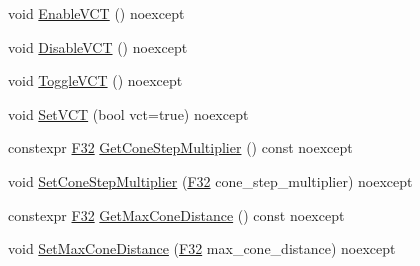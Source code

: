 \begin{DoxyCompactItemize}
\item 
void \hyperlink{classmage_1_1rendering_1_1_voxelization_settings_a1f08a9e6c02ce6c3e392cdb1ad30f75e}{Enable\+V\+CT} () noexcept
\item 
void \hyperlink{classmage_1_1rendering_1_1_voxelization_settings_a7092d02a0878dad9ec4fa21ce1024147}{Disable\+V\+CT} () noexcept
\item 
void \hyperlink{classmage_1_1rendering_1_1_voxelization_settings_a930c8f4d3723e67e8cbfc2b41533ead8}{Toggle\+V\+CT} () noexcept
\item 
void \hyperlink{classmage_1_1rendering_1_1_voxelization_settings_a394b58dd3d414a406fd874f7e53b211f}{Set\+V\+CT} (bool vct=true) noexcept
\item 
constexpr \hyperlink{namespacemage_aa97e833b45f06d60a0a9c4fc22ae02c0}{F32} \hyperlink{classmage_1_1rendering_1_1_voxelization_settings_a672f561214738cbb64252b332e717693}{Get\+Cone\+Step\+Multiplier} () const noexcept
\item 
void \hyperlink{classmage_1_1rendering_1_1_voxelization_settings_a9eafb3795d3e8248196dd7e9c6d32671}{Set\+Cone\+Step\+Multiplier} (\hyperlink{namespacemage_aa97e833b45f06d60a0a9c4fc22ae02c0}{F32} cone\+\_\+step\+\_\+multiplier) noexcept
\item 
constexpr \hyperlink{namespacemage_aa97e833b45f06d60a0a9c4fc22ae02c0}{F32} \hyperlink{classmage_1_1rendering_1_1_voxelization_settings_aa79b36e2c7ef50513548512f2cedfb6b}{Get\+Max\+Cone\+Distance} () const noexcept
\item 
void \hyperlink{classmage_1_1rendering_1_1_voxelization_settings_a137c4c2186b5034f546d0b876cd0633e}{Set\+Max\+Cone\+Distance} (\hyperlink{namespacemage_aa97e833b45f06d60a0a9c4fc22ae02c0}{F32} max\+\_\+cone\+\_\+distance) noexcept
\end{DoxyCompactItemize}
